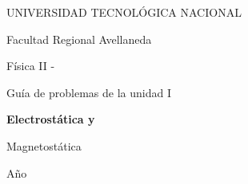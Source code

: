 \begin{titlepage}
    \begin{center}
    \vspace{1.5cm}
    

    \end{center}

    \begin{center}
        {\LARGE UNIVERSIDAD TECNOLÓGICA NACIONAL}\par\medskip
        \vspace*{0.25cm}
        {\LARGE Facultad Regional Avellaneda}\par\medskip
        \vspace*{1cm}
        {\Huge Física II - \comision}\par\medskip
        \vspace*{0.5cm}
        {\LARGE Guía de problemas de la unidad I}\par\bigskip
        \vspace*{1cm}
        {\Huge \bf \color[RGB]{0,121,138} Electrostática y \par Magnetostática\par\medskip}
    \end{center}

    \vspace{1cm}

    \begin{center}
        \begin{minipage}[t]{.7\textwidth}
            \renewcommand*{\contentsname}{Contenidos}
            \tableofcontents
        \end{minipage}
        \vspace*{\fill}
    \end{center}
    \begin{center}
        Año \anio
    \end{center}

\end{titlepage}

\newpage
{}
